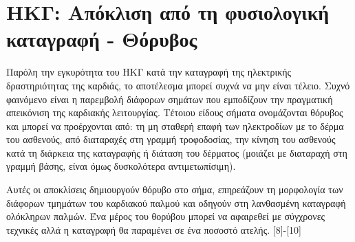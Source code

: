 \documentclass{report}
\begin{document}
\section{ΗΚΓ: Απόκλιση από τη φυσιολογική καταγραφή - Θόρυβος}
Παρόλη την εγκυρότητα του ΗΚΓ κατά την καταγραφή της ηλεκτρικής δραστηριότητας της καρδιάς, το αποτέλεσμα μπορεί συχνά να μην είναι τέλειο. Συχνό φαινόμενο είναι η παρεμβολή διάφορων σημάτων που εμποδίζουν την πραγματική απεικόνιση της καρδιακής λειτουργίας. Τέτοιου είδους σήματα ονομάζονται θόρυβος και μπορεί να προέρχονται από: τη μη σταθερή επαφή των ηλεκτροδίων με το δέρμα του ασθενούς, από διαταραχές στη γραμμή τροφοδοσίας, την κίνηση του ασθενούς κατά τη διάρκεια της καταγραφής ή διάταση του δέρματος (μοιάζει με διαταραχή στη γραμμή βάσης, είναι όμως δυσκολότερα αντιμετωπίσιμη). 
\par
Αυτές οι αποκλίσεις δημιουργούν θόρυβο στο σήμα, επηρεάζουν τη μορφολογία των διάφορων τμημάτων του καρδιακού παλμού και οδηγούν στη λανθασμένη καταγραφή ολόκληρων παλμών. Ένα μέρος του θορύβου μπορεί να αφαιρεθεί με σύγχρονες τεχνικές αλλά η καταγραφή θα παραμένει σε ένα ποσοστό ατελής. [8]-[10] 
\end{document}
